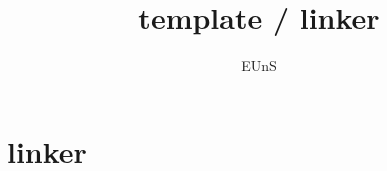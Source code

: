 \documentclass[10pt]{beamer}
\title{template / linker}
\author{EUnS}
\begin{document}

\begin{frame}{}
    \maketitle
\end{frame}    

\begin{frame}{}
    \tableofcontents
\end{frame}   

\section{linker}
\begin{frame}{}
\end{frame}    

\begin{frame}{}
\end{frame}    

\begin{frame}{}
\end{frame}    

\begin{frame}{}
\end{frame}    

\begin{frame}{}
\end{frame}    

\begin{frame}{}
\end{frame}    

\begin{frame}{}
\end{frame}    

\begin{frame}{}
\end{frame}    

\begin{frame}{}
\end{frame}    

\begin{frame}{}
\end{frame}    

\begin{frame}{}
\end{frame}    

\begin{frame}{}
\end{frame}    
\end{document}
